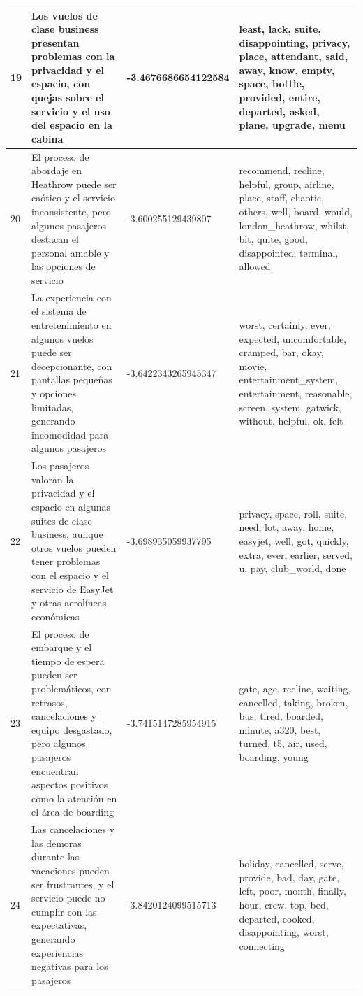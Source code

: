 \documentclass{report}
\begin{document}
\begin{longtable}{|p{1cm}|p{4cm}|p{4cm}|p{6cm}|}
                    \hline
                    19 & Los vuelos de clase business presentan problemas con la privacidad y el espacio, con quejas sobre el servicio y el uso del espacio en la cabina & -3.4676686654122584 & least, lack, suite, disappointing, privacy, place, attendant, said, away, know, empty, space, bottle, provided, entire, departed, asked, plane, upgrade, menu \\
                    \hline
                    20 & El proceso de abordaje en Heathrow puede ser caótico y el servicio inconsistente, pero algunos pasajeros destacan el personal amable y las opciones de servicio & -3.600255129439807 & recommend, recline, helpful, group, airline, place, staff, chaotic, others, well, board, would, london\_heathrow, whilst, bit, quite, good, disappointed, terminal, allowed \\
                    \hline
                    21 & La experiencia con el sistema de entretenimiento en algunos vuelos puede ser decepcionante, con pantallas pequeñas y opciones limitadas, generando incomodidad para algunos pasajeros & -3.6422343265945347 & worst, certainly, ever, expected, uncomfortable, cramped, bar, okay, movie, entertainment\_system, entertainment, reasonable, screen, system, gatwick, without, helpful, ok, felt \\
                    \hline
                    22 & Los pasajeros valoran la privacidad y el espacio en algunas suites de clase business, aunque otros vuelos pueden tener problemas con el espacio y el servicio de EasyJet y otras aerolíneas económicas & -3.698935059937795 & privacy, space, roll, suite, need, lot, away, home, easyjet, well, got, quickly, extra, ever, earlier, served, u, pay, club\_world, done \\
                    \hline
                    23 & El proceso de embarque y el tiempo de espera pueden ser problemáticos, con retrasos, cancelaciones y equipo desgastado, pero algunos pasajeros encuentran aspectos positivos como la atención en el área de boarding & -3.7415147285954915 & gate, age, recline, waiting, cancelled, taking, broken, bus, tired, boarded, minute, a320, best, turned, t5, air, used, boarding, young \\
                    \hline
                    24 & Las cancelaciones y las demoras durante las vacaciones pueden ser frustrantes, y el servicio puede no cumplir con las expectativas, generando experiencias negativas para los pasajeros & -3.8420124099515713 & holiday, cancelled, serve, provide, bad, day, gate, left, poor, month, finally, hour, crew, top, bed, departed, cooked, disappointing, worst, connecting \\

\end{longtable}
\end{document}

